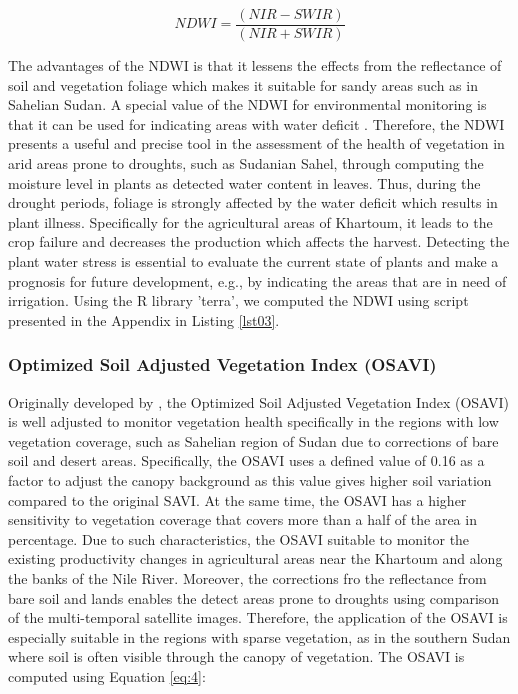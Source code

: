 \documentclass[jimaging,article,submit,pdftex,moreauthors]{Definitions/mdpi}
\begin{document}
\begin{equation}\label{eq:2}
	NDWI=\dfrac{(NIR-SWIR)}{(NIR+SWIR)}
\end{equation}

The advantages of the NDWI is that it lessens the effects from the reflectance of soil and vegetation foliage which makes it suitable for sandy areas such as in Sahelian Sudan. A special value of the NDWI for environmental monitoring is that it can be used for indicating areas with water deficit \cite{TENG2021107260}. Therefore, the NDWI presents a useful and precise tool in the assessment of the health of vegetation in arid areas prone to droughts, such as Sudanian Sahel, through computing the moisture level in plants as detected water content in leaves. Thus, during the drought periods, foliage is strongly affected by the water deficit which results in plant illness. Specifically for the agricultural areas of Khartoum, it leads to the crop failure and decreases the production which affects the harvest. Detecting the plant water stress is essential to evaluate the current state of plants and make a prognosis for future development, e.g., by indicating the areas that are in need of irrigation. Using the R library 'terra', we computed the NDWI using script presented in the Appendix in Listing \ref{lst03}.

\subsubsection{Optimized Soil Adjusted Vegetation Index (OSAVI)}

Originally developed by \cite{Rondeaux}, the Optimized Soil Adjusted Vegetation Index (OSAVI) is well adjusted to monitor vegetation health specifically in the regions with low vegetation coverage, such as Sahelian region of Sudan due to corrections of bare soil and desert areas. Specifically, the OSAVI uses a defined value of 0.16 as a factor to adjust the canopy background as this value gives higher soil variation compared to the original SAVI. At the same time, the OSAVI has a higher sensitivity to vegetation coverage that covers more than a half of the area in percentage. Due to such characteristics, the OSAVI suitable to monitor the existing productivity changes in agricultural areas near the Khartoum and along the banks of the Nile River. Moreover, the corrections fro the reflectance from bare soil and lands enables the detect areas prone to droughts using comparison of the multi-temporal satellite images. Therefore, the application of the OSAVI is especially suitable in the regions with sparse vegetation, as in the southern Sudan where soil is often visible through the canopy of vegetation. The OSAVI is computed using Equation \ref{eq:4}:
\end{document}
